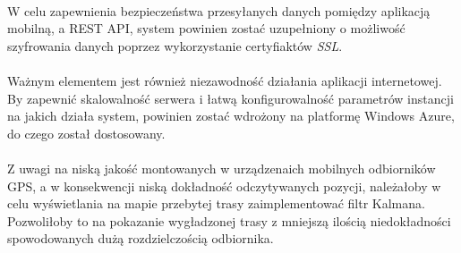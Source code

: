\paragraph{} %
W celu zapewnienia bezpieczeństwa przesyłanych danych pomiędzy aplikacją mobilną, a REST API, system powinien zostać uzupełniony o możliwość szyfrowania danych poprzez wykorzystanie certyfiaktów \textit{SSL}.

\paragraph{} %
 \label{par:}
 Ważnym elementem jest również niezawodność działania aplikacji internetowej. By zapewnić skalowalność serwera i łatwą konfigurowalność parametrów instancji na jakich działa system, powinien zostać wdrożony na platformę Windows Azure, do czego został dostosowany.

 \paragraph{} %
 \label{par:}
 
 Z uwagi na niską jakość montowanych w urządzenaich mobilnych odbiorników GPS, a w konsekwencji niską dokładność odczytywanych pozycji, należałoby w celu wyświetlania na mapie przebytej trasy zaimplementować filtr Kalmana. Pozwoliłoby to na pokazanie wygładzonej trasy z mniejszą ilością niedokładności spowodowanych dużą rozdzielczością odbiornika.